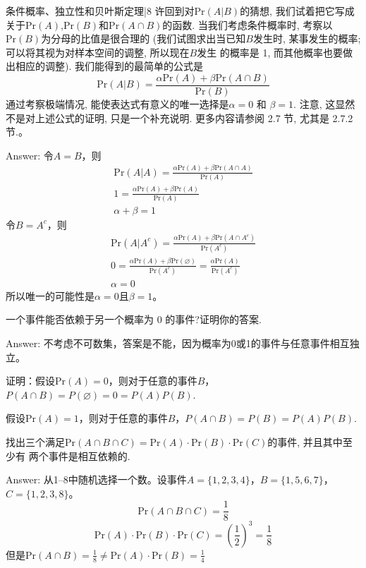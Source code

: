\newChapter 条件概率、独立性和贝叶斯定理|8
\exer 许回到对$\mathrm{Pr}(A|B)$的猜想, 我们试着把它写成关于$\mathrm{Pr}(A)$,$\mathrm{Pr}(B)$和$\mathrm{Pr}(A \cap B)$的函数. 当我们考虑条件概率时, 考察以$\mathrm{Pr}(B)$为分母的比值是很合理的 (我们试图求出当已知$B$发生时, 某事发生的概率;可以将其视为对样本空间的调整, 所以现在$B$发生 的概率是 1, 而其他概率也要做出相应的调整). 我们能得到的最简单的公式是
\[\mathrm{Pr}(A|B)=\frac{\alpha\mathrm{Pr}(A)+\beta\mathrm{Pr}(A\cap B)}{\mathrm{Pr}(B)}\]
通过考察极端情况, 能使表达式有意义的唯一选择是$\alpha= 0$ 和 $\beta= 1$. 注意, 这显然不是对上述公式的证明, 只是一个补充说明. 更多内容请参阅 2.7 节, 尤其是 2.7.2 节.。\par
Answer: 令$A=B$，则
\begin{gather*}
    \mathrm{Pr}(A|A)=\frac{\alpha\mathrm{Pr}(A)+\beta\mathrm{Pr}(A\cap A)}{\mathrm{Pr}(A)} \\
    1 = \frac{\alpha \mathrm{Pr}(A)+\beta\mathrm{Pr}(A)}{\mathrm{Pr}(A)} \\
    \alpha + \beta = 1
\end{gather*}
令$B=A^c$，则
\begin{gather*}
    \mathrm{Pr}(A|A^c)=\frac{\alpha\mathrm{Pr}(A)+\beta\mathrm{Pr}(A\cap A^c)}{\mathrm{Pr}(A^c)} \\
    0 = \frac{\alpha \mathrm{Pr}(A)+\beta\mathrm{Pr}(\varnothing)}{\mathrm{Pr}(A^c)} = \frac{\alpha \mathrm{Pr}(A)}{\mathrm{Pr}(A^c)} \\
    \alpha = 0
\end{gather*}
所以唯一的可能性是$\alpha=0$且$\beta=1$。

\exer 一个事件能否依赖于另一个概率为 0 的事件?证明你的答案.\par
Answer: 不考虑不可数集，答案是不能，因为概率为0或1的事件与任意事件相互独立。\par
证明：假设$\mathrm{Pr}(A)=0$，则对于任意的事件$B$，$P(A\cap B)=P(\varnothing) =0=P(A)P(B)$.\par
假设$\mathrm{Pr}(A)=1$，则对于任意的事件$B$，$P(A\cap B)=P(B) =P(A)P(B)$.

\exer 找出三个满足$\mathrm{Pr}(A\cap B\cap C) = \mathrm{Pr}(A) \cdot \mathrm{Pr}(B) \cdot \mathrm{Pr}(C)$的事件, 并且其中至少有
两个事件是相互依赖的.\par
Answer: 从1--8中随机选择一个数。设事件$A=\{1,2,3,4\}$，$B=\{1,5,6,7\}$，$C=\{1,2,3,8\}$。
\[\mathrm{Pr}(A\cap B\cap C)=\frac{1}{8}\]
\[\mathrm{Pr}(A) \cdot \mathrm{Pr}(B) \cdot \mathrm{Pr}(C)=\left(\frac{1}{2}\right)^3=\frac{1}{8}\]
但是$\mathrm{Pr}(A\cap B)=\frac{1}{8}\not=\mathrm{Pr}(A) \cdot \mathrm{Pr}(B)=\frac{1}{4}$

